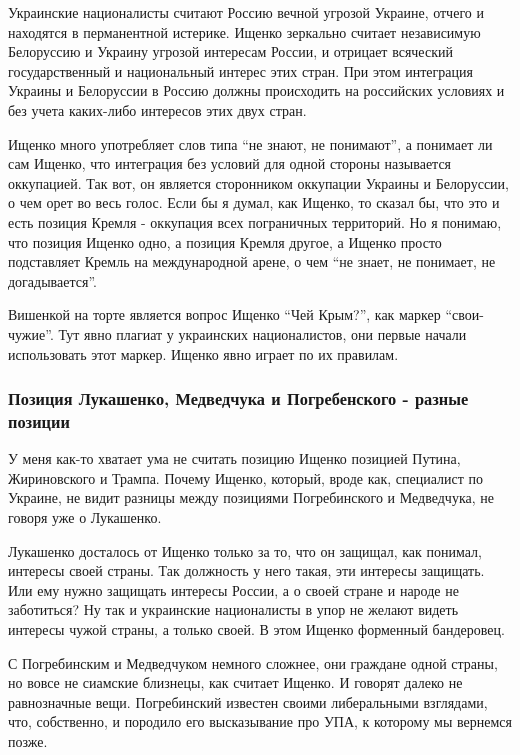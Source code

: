 Украинские националисты считают Россию вечной угрозой Украине, отчего и
находятся в перманентной истерике. Ищенко зеркально считает независимую
Белоруссию и Украину угрозой интересам России, и отрицает всяческий
государственный и национальный интерес этих стран. При этом интеграция Украины
и Белоруссии в Россию должны происходить на российских условиях и без учета
каких-либо интересов этих двух стран. 

Ищенко много употребляет слов типа \enquote{не знают, не понимают}, а понимает
ли сам Ищенко, что интеграция без условий для одной стороны называется
оккупацией. Так вот, он является сторонником оккупации Украины и Белоруссии, о
чем орет во весь голос. Если бы я думал, как Ищенко, то сказал бы, что это и
есть позиция Кремля - оккупация всех пограничных территорий. Но я понимаю, что
позиция Ищенко одно, а позиция Кремля другое, а Ищенко просто подставляет
Кремль на международной арене, о чем \enquote{не знает, не понимает, не
догадывается}. 

Вишенкой на торте является вопрос Ищенко \enquote{Чей Крым?}, как маркер \enquote{свои-чужие}.
Тут явно плагиат у украинских националистов, они первые начали использовать
этот маркер. Ищенко явно играет по их правилам. 

\subsubsection{Позиция Лукашенко, Медведчука и Погребенского - разные позиции}

У меня как-то хватает ума не считать позицию Ищенко позицией Путина,
Жириновского и Трампа. Почему Ищенко, который, вроде как, специалист по
Украине, не видит разницы между позициями Погребинского и Медведчука, не говоря
уже о Лукашенко.  

Лукашенко досталось от Ищенко только за то, что он защищал, как понимал,
интересы своей страны. Так должность у него такая, эти интересы защищать. Или
ему нужно защищать интересы России, а о своей стране и народе не заботиться? Ну
так и украинские националисты в упор не желают видеть интересы чужой страны, а
только своей. В этом Ищенко форменный бандеровец. 

С Погребинским и Медведчуком немного сложнее, они граждане одной страны, но
вовсе не сиамские близнецы, как считает Ищенко. И говорят далеко не
равнозначные вещи. Погребинский известен своими либеральными взглядами, что,
собственно, и породило его высказывание про УПА, к которому мы вернемся позже. 

